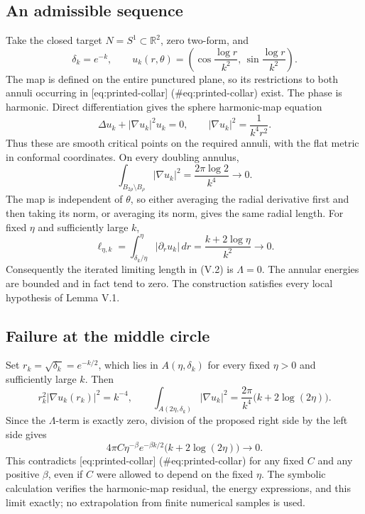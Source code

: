 \documentclass[10pt]{article}
\begin{document}
\subsection*{An admissible sequence}
Take the closed target \(N=S^1\subset\mathbb R^2\), zero two-form, and \[\delta_k=e^{-k},\qquad
 u_k(r,\theta)=
 \left(\cos\frac{\log r}{k^2},\,
       \sin\frac{\log r}{k^2}\right).\] The map is defined on the entire punctured plane, so its restrictions to both annuli occurring in [eq:printed-collar] (\#eq:printed-collar) exist. The phase is harmonic. Direct differentiation gives the sphere harmonic-map equation \[\Delta u_k+|\nabla u_k|^2u_k=0,
 \qquad |\nabla u_k|^2=\frac{1}{k^4r^2}.\] Thus these are smooth critical points on the required annuli, with the flat metric in conformal coordinates. On every doubling annulus, \[\int_{B_{2\rho}\setminus B_\rho}|\nabla u_k|^2
 =\frac{2\pi\log2}{k^4}\longrightarrow0.\] The map is independent of \(\theta\), so either averaging the radial derivative first and then taking its norm, or averaging its norm, gives the same radial length. For fixed \(\eta\) and sufficiently large \(k\), \[\ell_{\eta,k}
 =\int_{\delta_k/\eta}^{\eta}|\partial_r u_k|\,dr
 =\frac{k+2\log\eta}{k^2}
 \longrightarrow0.\] Consequently the iterated limiting length in (V.2) is \(\Lambda=0\). The annular energies are bounded and in fact tend to zero. The construction satisfies every local hypothesis of Lemma V.1.\par
\subsection*{Failure at the middle circle}
Set \(r_k=\sqrt{\delta_k}=e^{-k/2}\), which lies in \(A(\eta,\delta_k)\) for every fixed \(\eta>0\) and sufficiently large \(k\). Then \[r_k^2|\nabla u_k(r_k)|^2=k^{-4},
 \qquad
 \int_{A(2\eta,\delta_k)}|\nabla u_k|^2
 =\frac{2\pi}{k^4}\bigl(k+2\log(2\eta)\bigr).\] Since the \(\Lambda\)-term is exactly zero, division of the proposed right side by the left side gives \[4\pi C\eta^{-\beta}e^{-\beta k/2}
       \bigl(k+2\log(2\eta)\bigr)\longrightarrow0.\] This contradicts [eq:printed-collar] (\#eq:printed-collar) for any fixed \(C\) and any positive \(\beta\), even if \(C\) were allowed to depend on the fixed \(\eta\). The symbolic calculation verifies the harmonic-map residual, the energy expressions, and this limit exactly; no extrapolation from finite numerical samples is used.\par
\end{document}
